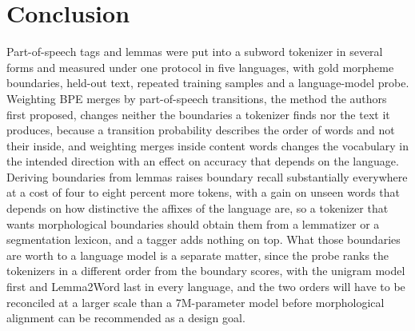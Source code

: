 \section{Conclusion}\label{sec:conclusion}
Part-of-speech tags and lemmas were put into a subword tokenizer in several forms and measured under one protocol in five languages, with gold morpheme boundaries, held-out text, repeated training samples and a language-model probe.
Weighting BPE merges by part-of-speech transitions, the method the authors first proposed, changes neither the boundaries a tokenizer finds nor the text it produces, because a transition probability describes the order of words and not their inside, and weighting merges inside content words changes the vocabulary in the intended direction with an effect on accuracy that depends on the language.
Deriving boundaries from lemmas raises boundary recall substantially everywhere at a cost of four to eight percent more tokens, with a gain on unseen words that depends on how distinctive the affixes of the language are, so a tokenizer that wants morphological boundaries should obtain them from a lemmatizer or a segmentation lexicon, and a tagger adds nothing on top.
What those boundaries are worth to a language model is a separate matter, since the probe ranks the tokenizers in a different order from the boundary scores, with the unigram model first and Lemma2Word last in every language, and the two orders will have to be reconciled at a larger scale than a 7M-parameter model before morphological alignment can be recommended as a design goal.
